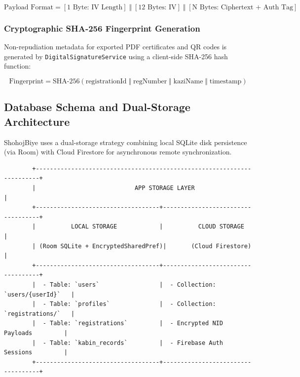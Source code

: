\documentclass[12pt,a4paper]{article}
\begin{document}
	\begin{equation}
		\text{Payload Format} = [\text{1 Byte: IV Length}] \;\Vert\; [\text{12 Bytes: IV}] \;\Vert\; [\text{N Bytes: Ciphertext + Auth Tag}]
	\end{equation}
	
	\subsubsection{Cryptographic SHA-256 Fingerprint Generation}
	Non-repudiation metadata for exported PDF certificates and QR codes is generated by \texttt{DigitalSignatureService} using a client-side SHA-256 hash function:
	
	\begin{equation}
		\text{Fingerprint} = \text{SHA-256}(\text{registrationId} \;\Vert\; \text{regNumber} \;\Vert\; \text{kaziName} \;\Vert\; \text{timestamp})
	\end{equation}
	
	\subsection{Database Schema and Dual-Storage Architecture}
	ShohojBiye uses a dual-storage strategy combining local SQLite disk persistence (via Room) with Cloud Firestore for asynchronous remote synchronization.
	
	\begin{lstlisting}
		+-----------------------------------------------------------------------+
		|                            APP STORAGE LAYER                          |
		+-----------------------------------+-----------------------------------+
		|          LOCAL STORAGE            |          CLOUD STORAGE            |
		| (Room SQLite + EncryptedSharedPref)|       (Cloud Firestore)          |
		+-----------------------------------+-----------------------------------+
		|  - Table: `users`                 |  - Collection: `users/{userId}`   |
		|  - Table: `profiles`              |  - Collection: `registrations/`   |
		|  - Table: `registrations`         |  - Encrypted NID Payloads         |
		|  - Table: `kabin_records`         |  - Firebase Auth Sessions         |
		+-----------------------------------+-----------------------------------+
	\end{lstlisting}
	
\end{document}

